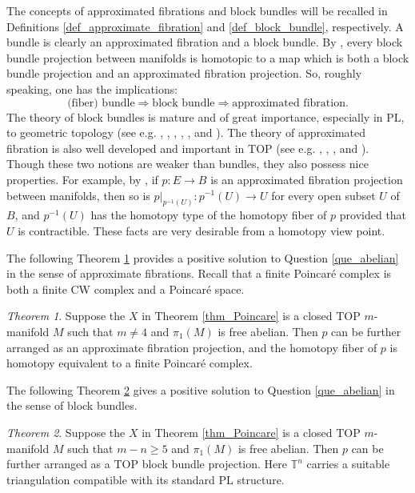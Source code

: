 \documentclass[12pt]{amsart}
\theoremstyle{plain}
\theoremstyle{definition}
\theoremstyle{question}
\theoremstyle{remark}
\theoremstyle{assumption}
\numberwithin{equation}{section}
\theoremstyle{bigthm}
\newtheorem{bigthm}{Theorem}
\begin{document}
The concepts of approximated fibrations and block bundles will be recalled in Definitions \ref{def_approximate_fibration} and \ref{def_block_bundle}, respectively. A bundle is clearly an approximated fibration and a block bundle. By \cite[Lemma~3.3.1]{Quinn79}, every block bundle projection between manifolds is homotopic to a map which is both a block bundle projection and an approximated fibration projection. So, roughly speaking, one has the implications:
\[
\text{(fiber) bundle} \Rightarrow \text{block bundle} \Rightarrow \text{approximated fibration}.
\]
The theory of block bundles is mature and of great importance, especially in $\mathrm{PL}$, to geometric topology (see e.g. \cite{Rourke_Sanderson68I}, \cite{Rourke_Sanderson68II}, \cite{Rourke_Sanderson68III}, \cite{Rourke_Sanderson71}, \cite{BLR1975}, and \cite{Ebert_Randal}). The theory of approximated fibration is also well developed and important in $\mathrm{TOP}$ (see e.g. \cite{Coram_Duvall1}, \cite{Coram_Duvall2}, \cite{Ferry}, \cite{HTW90} and \cite{FLS2018}). Though these two notions are weaker than bundles, they also possess nice properties. For example, by \cite[Corollary~12.14~\&~Theorem~12.15]{HTW90}, if $p \colon  E \rightarrow B$ is an approximated fibration projection between manifolds, then so is $p|_{p^{-1} (U)} \colon  p^{-1} (U) \rightarrow U$ for every open subset $U$ of $B$, and $p^{-1} (U)$ has the homotopy type of the homotopy fiber of $p$ provided that $U$ is contractible. These facts are very desirable from a homotopy view point.

The following Theorem \ref{thm_approximate_fibration} provides a positive solution to Question \ref{que_abelian} in the sense of approximate fibrations. Recall that a finite Poincar\'{e} complex is both a finite CW complex and a Poincar\'{e} space.
\begin{bigthm}\label{thm_approximate_fibration}
Suppose the $X$ in Theorem \ref{thm_Poincare} is a closed $\mathrm{TOP}$ $m$-manifold $M$ such that $m \ne 4$ and $\pi_{1} (M)$ is free abelian. Then $p$ can be further arranged as an approximate fibration projection, and the homotopy fiber of $p$ is homotopy equivalent to a finite Poincar\'{e} complex.
\end{bigthm}

The following Theorem \ref{thm_block_bundle} gives a positive solution to Question \ref{que_abelian} in the sense of block bundles.
\begin{bigthm}\label{thm_block_bundle}
Suppose the $X$ in Theorem \ref{thm_Poincare} is a closed $\mathrm{TOP}$ $m$-manifold $M$ such that $m-n \ge 5$ and $\pi_{1} (M)$ is free abelian. Then $p$ can be further arranged as a $\mathrm{TOP}$ block bundle projection. Here $\mathbb{T}^{n}$ carries a suitable triangulation compatible with its standard $\mathrm{PL}$ structure.
\end{bigthm}
\end{document}
